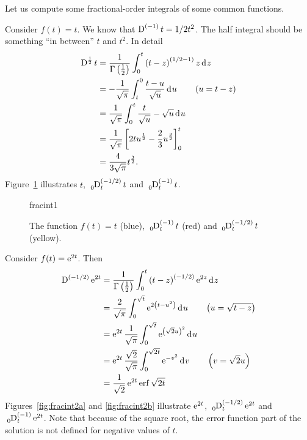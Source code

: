     Let us compute some fractional-order integrals of some common functions.

    \begin{example}
      Consider $f(t) = t$. We know that $\tensor*[]{\D}{^{(-1)}}t = 1/2 t^2$. The half integral should be something ``in between'' $t$ and $t^2$. In detail
      \begin{align*}
	\tensor*[]{\D}{^{\frac{1}{2}}} t &= \frac{1}{\Gamma \left( \frac{1}{2} \right)} \int_0^t \left( t - z \right)^{\left( 1/2 - 1 \right)} z \d z \\
	&= -\frac{1}{\sqrt{\pi}} \int_t^0 \frac{t - u}{\sqrt{u}} \d u \qquad \left(u = t - z \right)\\
	&= \frac{1}{\sqrt{\pi}} \int_0^t \frac{t}{\sqrt{u}} - \sqrt{u} \d u \\
	&= \frac{1}{\sqrt{\pi}} \left[ 2 t u^\frac{1}{2} - \frac{2}{3} u^\frac{3}{2} \right]_0^t \\
	&= \frac{4}{3 \sqrt{\pi}} t^\frac{3}{2}.
	\label{ex:fracint1}
      \end{align*}
      Figure~\ref{fig:fracint1} illustrates $t$, $\tensor*[_0]{\D}{^{\left( -1/2 \right)}_t} t$ and $\tensor*[_0]{\D}{^{(-1)}_t} t$.
      \label{ex:fracint1}
    \end{example}

    \begin{figure}
      \centering
      {fracint1}
      \caption{The function $f(t) = t$ (blue), $\tensor*[_0]{\D}{^{(-1)}_t}t$ (red) and $\tensor*[_0]{\D}{^{(-1/2)}_t} t$ (yellow).}
      \label{fig:fracint1}
    \end{figure}

    \begin{example}
      Consider $f(t) = \operatorname{e}^{ 2 t }$. Then
      \begin{align*}
	\tensor*[]{\D}{^{\left(-1/2\right)}} \e^{2 t} &= \frac{1}{\Gamma \left( \frac{1}{2} \right)} \int_0^t \left( t - z \right)^{(-1/2)} \e^{2 z} \d z \\
	&= \frac{2}{\sqrt{\pi}} \int_0^{\sqrt{t}} \e^{ 2 \left( t - u^2 \right) } \d u \qquad \left( u = \sqrt{t - z} \right) \\
	&= \e^{2 t} \frac{1}{\sqrt{\pi}} \int_0^{\sqrt{t}} \e^{\left( \sqrt{2} u \right)^2} \d u \\
	&= \e^{2 t} \frac{\sqrt{2}}{\sqrt{\pi}} \int_0^{\sqrt{2 t}} \e^{-v^2} \d v \qquad \left( v = \sqrt{2} u \right) \\
	&= \frac{1}{\sqrt{2}} \e^{2 t} \erf{\sqrt{2 t}}
      \end{align*}
      Figures~\ref{fig:fracint2a} and \ref{fig:fracint2b} illustrate $\operatorname{e}^{2 t}$, $\tensor*[_0]{\D}{^{\left( -1/2 \right)}_t} \e^{2 t}$ and $\tensor*[_0]{\D}{^{(-1)}_t} \e^{2 t}$. Note that because of the square root, the error function part of the solution is not defined for negative values of $t$.
    \end{example}

